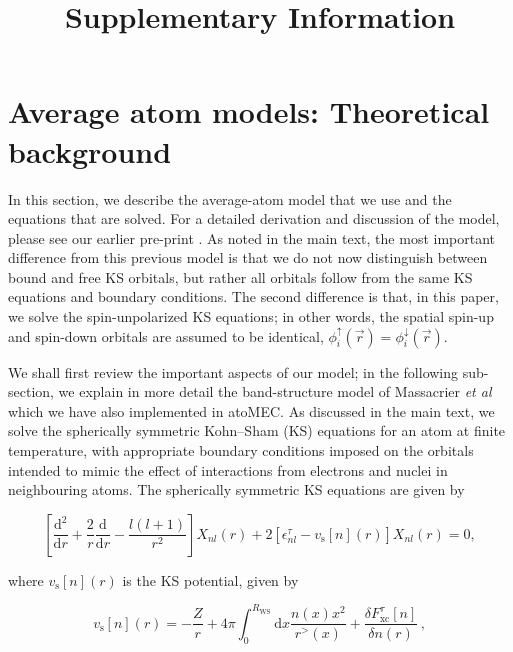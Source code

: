 \documentclass[preprint,aps]{revtex4-2}
\title{Supplementary Information}
\begin{document}
    
    \maketitle
    
    

    
    \hypertarget{average-atom-models-theoretical-background}{%
\section{Average atom models: Theoretical
background}\label{average-atom-models-theoretical-background}}

In this section, we describe the average-atom model that we use and the
equations that are solved. For a detailed derivation and discussion of
the model, please see our earlier pre-print
\cite{callow2021firstprinciples}. As noted in the main text, the most
important difference from this previous model is that we do not now
distinguish between bound and free KS orbitals, but rather all orbitals
follow from the same KS equations and boundary conditions. The second
difference is that, in this paper, we solve the spin-unpolarized KS
equations; in other words, the spatial spin-up and spin-down orbitals
are assumed to be identical,
\(\phi_i^\uparrow(\vec{r})=\phi_i^\downarrow(\vec{r})\).

We shall first review the important aspects of our model; in the
following sub-section, we explain in more detail the band-structure
model of Massacrier \emph{et al} \cite{massacrier_band} which we have
also implemented in atoMEC. As discussed in the main text, we solve the
spherically symmetric Kohn--Sham (KS) equations for an atom at finite
temperature, with appropriate boundary conditions imposed on the
orbitals intended to mimic the effect of interactions from electrons and
nuclei in neighbouring atoms. The spherically symmetric KS equations are
given by

\begin{equation}
\left[\frac{\textrm{d}^2}{\textrm{d}r} + \frac{2}{r}\frac{\textrm{d}}{\textrm{d}r} - \frac{l(l+1)}{r^2} \right] X_{nl}(r) + 2 \left[\epsilon^{\tau}_{nl} - v_\textrm{s}[n](r) \right] X_{nl}(r) = 0,
\end{equation}

where \(v_\textrm{s}[n](r)\) is the KS potential, given by

\begin{equation}
 v_{\textrm{s}}[n](r) = -\frac{Z}{r} + 4\pi \int_0^{R_\textrm{WS}} \textrm{d}{x} \frac{n(x)x^2}{r^>(x)} + \frac{\delta F_\textrm{xc}^\tau [n]}{\delta n(r)}\,,
\end{equation}
\end{document}
